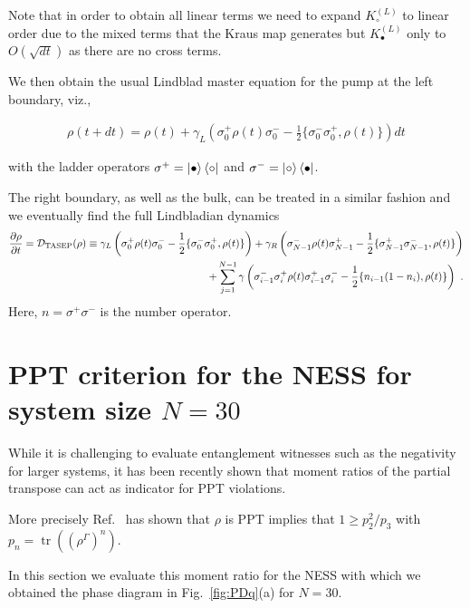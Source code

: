 \documentclass[aps,prl,twocolumn,groupedaddress,superscriptaddress,colorlinks,bookmarks=false,citecolor=darkspringgreen,linkcolor=darkolivegreen,urlcolor=navyblue]{revtex4-1}
\begin{document}
Note that in order to obtain all linear terms we need to expand $K_{\circ}^{(L)}$ to linear order due to the mixed terms that the Kraus map generates but $K_{\bullet}^{(L)}$ only to $O(\sqrt{dt})$ as there are no cross terms.

We then obtain the usual Lindblad master equation for the pump at the left boundary, viz.,


\begin{align}
    \rho(t+dt) =  \rho(t) + \gamma_L \left( \sigma_0^+\rho(t) \sigma_0^- -\frac{1}{2} \{\sigma_0^- \sigma_0^+,\rho(t)\}\right) dt
\end{align}


with the ladder operators $\sigma^+ = \ket{\bullet}\bra{\circ}$ and $\sigma^- = \ket{\circ}\bra{\bullet}$.

The right boundary, as well as the bulk, can be treated in a similar fashion and we eventually find the full Lindbladian dynamics
\begin{align}
\begin{split}
    \frac{\partial\rho}{\partial t} = \mathcal{D}_{\rm TASEP}(\rho) \equiv \gamma_L \left( \sigma_0^+\rho(t) \sigma_0^- -\frac{1}{2}\{ \sigma_0^- \sigma_0^+,\rho(t)\} \right)
    + \gamma_R \left( \sigma_{N-1}^-\rho(t) \sigma_{N-1}^+ -\frac{1}{2} \{\sigma_{N-1}^+ \sigma_{N-1}^-,\rho(t)\}\right) \\
    +\sum_{j=1}^{N-1} \gamma \left( \sigma_{i-1}^-\sigma_{i}^+\rho(t)\sigma_{i-1}^+ \sigma_i^- -\frac{1}{2}\{ n_{i-1} (1-n_i),\rho(t)\} \right) \ .
\end{split}
\end{align}
Here, $n = \sigma^+ \sigma^-$ is the number operator.

\section{PPT criterion for the NESS for system size $N=30$}

While it is challenging to evaluate entanglement witnesses such as the negativity for larger systems, it has been recently shown that moment ratios of the partial transpose can act as indicator for PPT violations.

More precisely Ref.~\cite{Elben20} has shown that $\rho$ is PPT implies that $1\geq p_2^2/p_3$ with $p_n = \operatorname{tr}((\rho^\Gamma)^n)$.

In this section we evaluate this moment ratio for the NESS with which we obtained the phase diagram in Fig.~\ref{fig:PDq}(a) for $N=30$.
\end{document}
